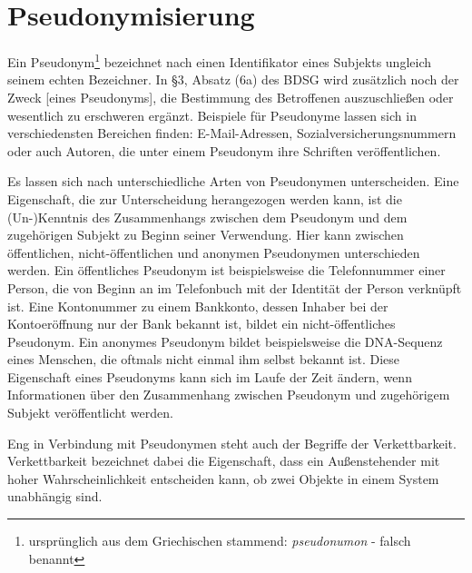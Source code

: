 \section{Pseudonymisierung}

\label{sec_basics_pseudonymity}

Ein Pseudonym\footnote{
	ursprünglich aus dem Griechischen stammend: \textit{pseudonumon} - falsch benannt
} bezeichnet nach \cite{pfitzmann2010} einen Identifikator eines Subjekts ungleich seinem echten Bezeichner. In §3, Absatz (6a) des BDSG wird zusätzlich noch der \glqq Zweck [eines Pseudonyms], die Bestimmung des Betroffenen auszuschließen oder wesentlich zu erschweren\grqq{}\cite{TODO} ergänzt. Beispiele für Pseudonyme lassen sich in verschiedensten Bereichen finden: E-Mail-Adressen, Sozialversicherungsnummern oder auch Autoren, die unter einem Pseudonym ihre Schriften veröffentlichen.

Es lassen sich nach \cite{pfitzmann1990} unterschiedliche Arten von Pseudonymen unterscheiden. Eine Eigenschaft, die zur Unterscheidung herangezogen werden kann, ist die (Un-)Kenntnis des Zusammenhangs zwischen dem Pseudonym und dem zugehörigen Subjekt zu Beginn seiner Verwendung. Hier kann zwischen öffentlichen, nicht-öffentlichen und anonymen Pseudonymen unterschieden werden. Ein öffentliches Pseudonym ist beispielsweise die Telefonnummer einer Person, die von Beginn an im Telefonbuch mit der Identität der Person verknüpft ist. Eine Kontonummer zu einem Bankkonto, dessen Inhaber bei der Kontoeröffnung nur der Bank bekannt ist, bildet ein nicht-öffentliches Pseudonym. Ein anonymes Pseudonym bildet beispielsweise die DNA-Sequenz eines Menschen, die oftmals nicht einmal ihm selbst bekannt ist. Diese Eigenschaft eines Pseudonyms kann sich im Laufe der Zeit ändern, wenn Informationen über den Zusammenhang zwischen Pseudonym und zugehörigem Subjekt veröffentlicht werden.

Eng in Verbindung mit Pseudonymen steht auch der Begriffe der Verkettbarkeit. 
Verkettbarkeit bezeichnet dabei die Eigenschaft, dass ein Außenstehender mit hoher Wahrscheinlichkeit entscheiden kann, ob zwei Objekte in einem System unabhängig sind\cite{pfitzmann2010}.

